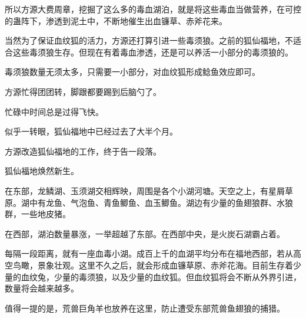\begin{this_body}
所以方源大费周章，挖掘了这么多的毒血湖泊，就是将这些毒血当做营养，在可控的蛊阵下，渗透到泥土中，不断地催生出血镰草、赤斧花来。

当然为了保证血纹狐的活力，方源还打算引进一些毒须狼。之前的狐仙福地，不适合这些毒须狼生存。但现在有着毒血渗透，还是可以养活一小部分的毒须狼的。

毒须狼数量无须太多，只需要一小部分，对血纹狐形成鲶鱼效应即可。

方源忙得团团转，脚跟都要踢到后脑勺了。

忙碌中时间总是过得飞快。

似乎一转眼，狐仙福地中已经过去了大半个月。

方源改造狐仙福地的工作，终于告一段落。

狐仙福地焕然新生。

在东部，龙鳞湖、玉须湖交相辉映，周围是各个小湖河塘。天空之上，有星屑草原。湖中有龙鱼、气泡鱼、青鱼鲫鱼、血玉鲫鱼。湖边有少量的鱼翅狼群、水狼群，一些地皮猪。

在西部，湖泊数量暴涨，一举超越了东部。在西部中央，是火炭石湖霸占着。

每隔一段距离，就有一座血毒小湖。成百上千的血湖平均分布在福地西部，若从高空鸟瞰，景象壮观。这里不久之后，就会形成血镰草原、赤斧花海。目前生存着少量的血纹兔，少量的毒须狼，以及少量的血纹狐。但血纹狐将会不断从外界引进，数量将会越来越多。

值得一提的是，荒兽巨角羊也放养在这里，防止遭受东部荒兽鱼翅狼的捕猎。

\end{this_body}


